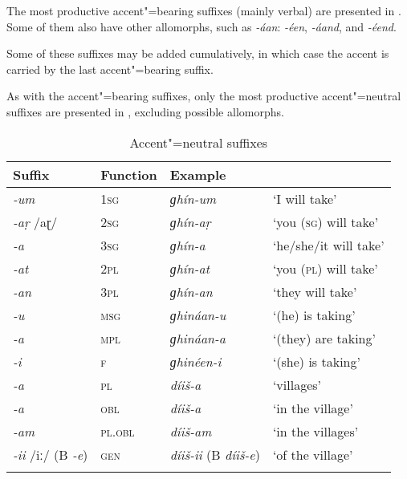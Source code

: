 The most productive accent"=bearing suffixes (mainly verbal) are presented in . Some of them also have other allomorphs, such as \textit{-áan}: \textit{-éen}, \textit{-áand}, and \textit{-éend}.


Some of these suffixes may be added cumulatively, in which case the accent is carried by the last accent"=bearing suffix.


As with the accent"=bearing suffixes, only the most productive accent"=neutral suffixes are presented in , excluding possible allomorphs.



\begin{table}[ht]
\caption{Accent"=neutral suffixes}
\begin{tabularx}{\textwidth}{ l@{\hspace{20pt}} l@{\hspace{20pt}} l@{\hspace{20pt}} Q }
\lsptoprule
Suffix &
Function &
Example &
\\\hline
\textit{-um} &
\textsc{1sg} &
\textit{ɡhín-um} &
`I will take'\\
\textit{-aṛ} /aɽ/ &
\textsc{2sg} &
\textit{ɡhín-aṛ} &
`you (\textsc{sg}) will take'\\
\textit{-a} &
\textsc{3sg} &
\textit{ɡhín-a} &
`he/she/it will take'\\
\textit{-at} &
\textsc{2pl} &
\textit{ɡhín-at} &
`you (\textsc{pl}) will take'\\
\textit{-an} &
\textsc{3pl} &
\textit{ɡhín-an} &
`they will take'\\
\textit{-u} &
\textsc{msg} &
\textit{ɡhináan-u} &
`(he) is taking'\\
\textit{-a} &
\textsc{mpl} &
\textit{ɡhináan-a} &
`(they) are taking'\\
\textit{-i} &
\textsc{f} &
\textit{ɡhinéen-i} &
`(she) is taking'\\
\textit{-a} &
\textsc{pl} &
\textit{díiš-a} &
`villages'\\
\textit{-a} &
\textsc{obl} &
\textit{díiš-a} &
`in the village'\\
\textit{-am} &
\textsc{pl.obl} &
\textit{díiš-am} &
`in the villages'\\
\textit{-ii} /iː/ (B \textit{-e}) &
\textsc{gen} &
\textit{díiš-ii} (B \textit{díiš-e}) &
`of the village'\\\lspbottomrule
\end{tabularx}
\label{tab:3-6}
\end{table}


